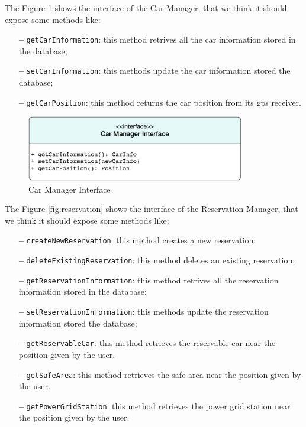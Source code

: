 \newline
The Figure \ref{fig:car} shows the interface of the Car Manager, that we think it should expose some methods like:

\begin{itemize}
\item[\textbf{--}] \texttt{getCarInformation}: this method retrives all the car information stored in the database;
\item[\textbf{--}] \texttt{setCarInformation}: this methods update the car information stored the database;
\item[\textbf{--}] \texttt{getCarPosition}: this method returns the car position from its \acs{gps} receiver.
\end{itemize}

\begin{figure}[htbp]
\centering
\vspace{72pt}
\includegraphics[width=0.85\textwidth]{Images/CarManager.pdf}
\vspace{10pt}
\caption{Car Manager Interface}
\label{fig:car}
\end{figure}
\clearpage

\newline
The Figure \ref{fig:reservation} shows the interface of the Reservation Manager, that we think it should expose some methods like:

\begin{itemize}
\item[\textbf{--}] \texttt{createNewReservation}: this method creates a new reservation;
\item[\textbf{--}] \texttt{deleteExistingReservation}: this method deletes an existing reservation;
\item[\textbf{--}] \texttt{getReservationInformation}: this method retrives all the reservation information stored in the database;
\item[\textbf{--}] \texttt{setReservationInformation}: this methods update the reservation information stored the database;
\item[\textbf{--}] \texttt{getReservableCar}: this method retrieves the reservable car near the position given by the user.
\item[\textbf{--}] \texttt{getSafeArea}: this method retrieves the safe area near the position given by the user.
\item[\textbf{--}] \texttt{getPowerGridStation}: this method retrieves the power grid station near the position given by the user.
\end{itemize}

